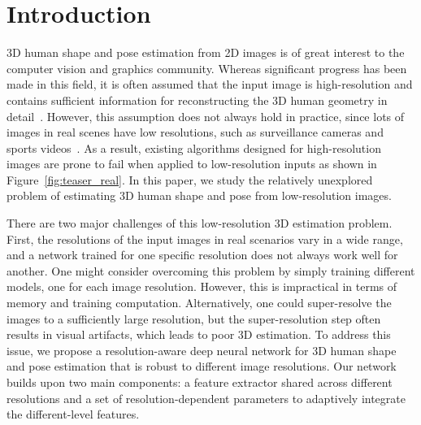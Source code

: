 \documentclass[runningheads]{llncs}
\begin{document}
\section{Introduction}
3D human shape and pose estimation from 2D images is of great interest to the computer vision and graphics community.
Whereas significant progress has been made in this field,
it is often assumed that the input image is high-resolution and contains sufficient information for reconstructing the 3D human geometry in detail~\cite{alldieck2019learning,alldieck2018video,bogo2016keep,kanazawa2018end,kanazawa2019learning,kocabas2019vibe,kolotouros2019spin,natsume2019siclope,pavlakos2018learning,pumarola20193dpeople,saito2019pifu,zheng2019deephuman}.
However, this assumption does not always hold in practice, since lots of images in real scenes have low resolutions, such as surveillance cameras and sports videos~\cite{xxy-iccv17,wang2016studying,nishibori2014exemplar,neumann2018tiny,xu2019towards,oh2011large}.
As a result, existing algorithms designed for high-resolution images are prone to fail when applied to low-resolution inputs as shown in   Figure~\ref{fig:teaser_real}. 
In this paper, we study the relatively unexplored problem  of estimating  3D human shape and pose from  low-resolution images.





There are two major challenges of this low-resolution 3D estimation problem.
First, the resolutions of the input images in real scenarios vary in a wide range, and a network trained for one specific resolution does not always work well for another.
One might consider overcoming this problem by simply training different models, one for each image resolution. 
However, this is impractical in terms of memory and training computation.
Alternatively, one could super-resolve the images to a sufficiently large resolution, but the super-resolution step often results in visual artifacts, which leads to poor 3D estimation.
To address this issue, we propose a resolution-aware deep neural network for 3D human shape and pose estimation that is robust to different image resolutions. 
Our network builds upon two main components: a feature extractor shared across different resolutions and a set of resolution-dependent parameters to adaptively integrate the different-level features.
\end{document}
